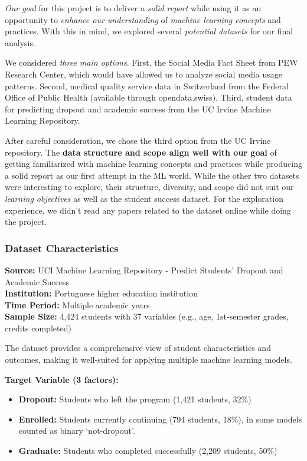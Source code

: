 \documentclass[
]{article}
\providecommand{\tightlist}{%
  \setlength{\itemsep}{0pt}\setlength{\parskip}{0pt}}
\begin{document}
\emph{Our goal} for this project is to deliver a \emph{solid report}
while using it as an opportunity to \emph{enhance our understanding} of
\emph{machine learning concepts} and practices. With this in mind, we
explored several \emph{potential datasets} for our final analysis.

We considered \emph{three main options}. First, the Social Media Fact
Sheet from PEW Research Center, which would have allowed us to analyze
social media usage patterns. Second, medical quality service data in
Switzerland from the Federal Office of Public Health (available through
opendata.swiss). Third, student data for predicting dropout and academic
success from the UC Irvine Machine Learning Repository.

After careful consideration, we chose the third option from the UC
Irvine repository. The \textbf{data structure and scope align well with
our goal} of getting familiarized with machine learning concepts and
practices while producing a solid report as our first attempt in the ML
world. While the other two datasets were interesting to explore, their
structure, diversity, and scope did not suit our \emph{learning
objectives} as well as the student success dataset. For the exploration
experience, we didn't read any papers related to the dataset online
while doing the project.

\subsubsection{Dataset Characteristics}\label{dataset-characteristics}

\textbf{Source:} UCI Machine Learning Repository - Predict Students'
Dropout and Academic Success\\
\textbf{Institution:} Portuguese higher education institution\\
\textbf{Time Period:} Multiple academic years\\
\textbf{Sample Size:} 4,424 students with 37 variables (e.g., age,
1st-semester grades, credits completed)

The dataset provides a comprehensive view of student characteristics and
outcomes, making it well-suited for applying multiple machine learning
models.

\textbf{Target Variable (3 factors):}

\begin{itemize}
\tightlist
\item
  \textbf{Dropout:} Students who left the program (1,421 students, 32\%)
\item
  \textbf{Enrolled:} Students currently continuing (794 students, 18\%),
  in some models counted as binary `not-dropout'.
\item
  \textbf{Graduate:} Students who completed successfully (2,209
  students, 50\%)
\end{itemize}
\end{document}
